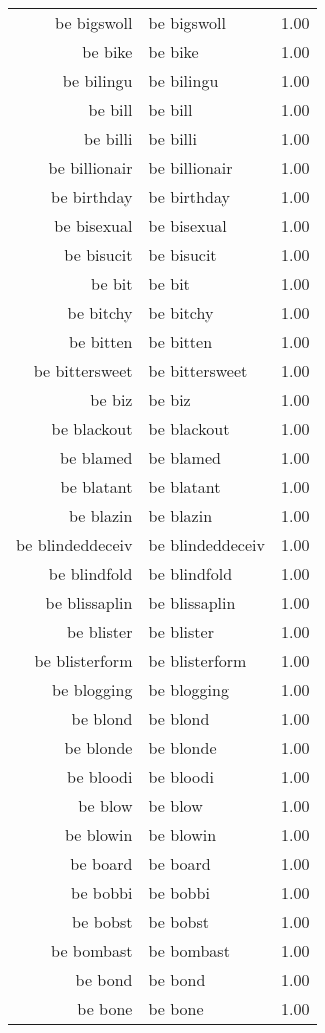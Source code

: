 \begin{table}[ht]
\begin{tabular}{rlr}
  be bigswoll & be bigswoll & 1.00 \\ 
  be bike & be bike & 1.00 \\ 
  be bilingu & be bilingu & 1.00 \\ 
  be bill & be bill & 1.00 \\ 
  be billi & be billi & 1.00 \\ 
  be billionair & be billionair & 1.00 \\ 
  be birthday & be birthday & 1.00 \\ 
  be bisexual & be bisexual & 1.00 \\ 
  be bisucit & be bisucit & 1.00 \\ 
  be bit & be bit & 1.00 \\ 
  be bitchy & be bitchy & 1.00 \\ 
  be bitten & be bitten & 1.00 \\ 
  be bittersweet & be bittersweet & 1.00 \\ 
  be biz & be biz & 1.00 \\ 
  be blackout & be blackout & 1.00 \\ 
  be blamed & be blamed & 1.00 \\ 
  be blatant & be blatant & 1.00 \\ 
  be blazin & be blazin & 1.00 \\ 
  be blindeddeceiv & be blindeddeceiv & 1.00 \\ 
  be blindfold & be blindfold & 1.00 \\ 
  be blissaplin & be blissaplin & 1.00 \\ 
  be blister & be blister & 1.00 \\ 
  be blisterform & be blisterform & 1.00 \\ 
  be blogging & be blogging & 1.00 \\ 
  be blond & be blond & 1.00 \\ 
  be blonde & be blonde & 1.00 \\ 
  be bloodi & be bloodi & 1.00 \\ 
  be blow & be blow & 1.00 \\ 
  be blowin & be blowin & 1.00 \\ 
  be board & be board & 1.00 \\ 
  be bobbi & be bobbi & 1.00 \\ 
  be bobst & be bobst & 1.00 \\ 
  be bombast & be bombast & 1.00 \\ 
  be bond & be bond & 1.00 \\ 
  be bone & be bone & 1.00 \\ 

\end{tabular}
\end{table}
